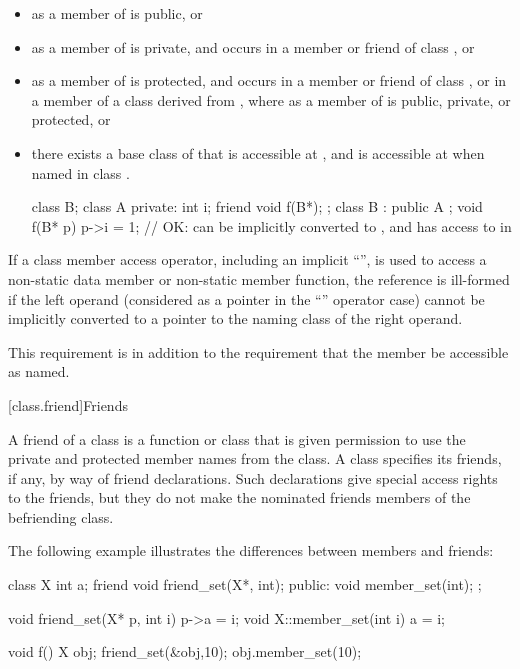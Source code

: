\begin{itemize}
\item
{}
as a member of
is public, or
\item
{}
as a member of
is private, and
occurs in a member or friend of class
,
or
\item
{}
as a member of
is protected, and
occurs in a member or friend of class
,
or in a member of a class
derived from
,
where
as a member of
is public, private, or protected, or
\item
there exists a base class
of
that is accessible at
,
and
is accessible at
when named in class
.
\begin{example}
\begin{codeblock}
class B;
class A {
private:
  int i;
  friend void f(B*);
};
class B : public A { };
void f(B* p) {
  p->i = 1;         // OK:  can be implicitly converted to , and  has access to  in 
}
\end{codeblock}
\end{example}
\end{itemize}

\pnum
If a class member access operator, including an implicit
``'',
is used to access a non-static data member or non-static
member function, the reference is ill-formed if the
left operand (considered as a pointer in the
``''
operator case) cannot be implicitly converted to a
pointer to the naming class of the right operand.
\begin{note}
This requirement is in addition to the requirement that
the member be accessible as named.
\end{note}

[class.friend]{Friends}%
%

\pnum
A friend of a class is a function or class that is
given permission to use the private and protected member names from the class.
A class specifies its friends, if any, by way of friend declarations.
Such declarations give special access rights to the friends, but they
do not make the nominated friends members of the befriending class.
\begin{example}
The following example illustrates the differences between
members and friends:
%

\begin{codeblock}
class X {
  int a;
  friend void friend_set(X*, int);
public:
  void member_set(int);
};

void friend_set(X* p, int i) { p->a = i; }
void X::member_set(int i) { a = i; }

void f() {
  X obj;
  friend_set(&obj,10);
  obj.member_set(10);
}
\end{codeblock}
\end{example}


